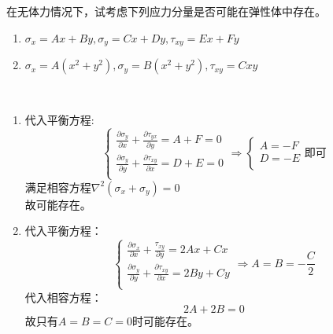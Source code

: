 \begin{example}
	在无体力情况下，试考虑下列应力分量是否可能在弹性体中存在。
	\begin{enumerate}
		\item $\sigma _x=Ax+By,\sigma _y=Cx+Dy,\tau _{xy}=Ex+Fy$
		\item $\sigma _x=A\left( x^2+y^2 \right) ,\sigma _y=B\left( x^2+y^2 \right) ,\tau _{xy}=Cxy$
	\end{enumerate}
\end{example}
	\begin{remark}
		\quad\\
		\begin{enumerate}
			\item 代入平衡方程:\[\begin{cases}
			\frac{\partial \sigma _y}{\partial x}+\frac{\partial \tau _{yx}}{\partial y}=A+F=0\\
			\frac{\partial \sigma _y}{\partial y}+\frac{\partial \tau _{xy}}{\partial x}=D+E=0\\
			\end{cases}\Longrightarrow \begin{cases}
			A=-F\\
			D=-E\\
			\end{cases}\text{即可}\]
			满足相容方程$\nabla ^2\left( \sigma _x+\sigma _y \right) =0$\\
			故可能存在。
			\item 代入平衡方程：\[\begin{cases}
			\frac{\partial \sigma _x}{\partial x}+\frac{\tau _{xy}}{\partial y}=2Ax+Cx\\
			\frac{\partial \sigma _y}{\partial y}+\frac{\partial \tau _{xy}}{\partial x}=2By+Cy\\
			\end{cases}\Longrightarrow A=B=-\frac{C}{2}\]
			代入相容方程：\[2A+2B=0\]
			故只有$A=B=C=0$时可能存在。
		\end{enumerate}
	\end{remark}

